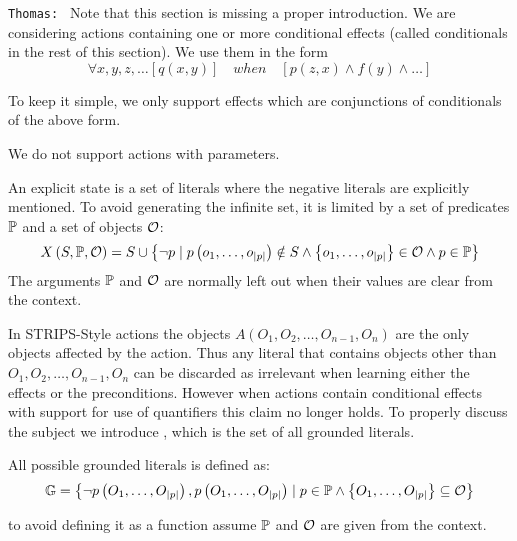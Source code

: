 \documentclass[\master/Master.tex]{subfiles}
\begin{document}
\texttt{Thomas: } Note that this section is missing a proper introduction. We are considering actions containing one or more conditional effects (called conditionals in the rest of this section). We use them in the form 
\begin{equation*}
    \forall x, y, z, \dots \left[ q(x, y) \right] \quad when \quad 
        \left[ p(z, x) \land f(y) \land \dots \right]
\end{equation*}

To keep it simple, we only support effects which are conjunctions of conditionals of the above form.

We do not support actions with parameters.


\begin{definition}
	An explicit state is a set of literals where the negative literals are explicitly mentioned. To avoid generating the infinite set, it is limited by a set of predicates $\mathbb{P}$ and a set of objects $\mathcal{O}$:
	\begin{equation*}
		X\left(S, \mathbb{P}, \mathcal{O}\right) = S \cup
		\left\{ \neg p \mid 
		p\left(o_1, \dots, o_{|p|}\right) \notin S \land 
		\left\{o_1, \dots, o_{|p|} \right\} \in \mathcal{O} \land
		p \in \mathbb{P}
		\right\}
	\end{equation*}
	The arguments $\mathbb{P}$ and $\mathcal{O}$ are normally left out when their values are clear from the context.
\end{definition}


In STRIPS-Style actions the objects $A(O_1,O_2,\ldots,O_{n-1},O_n)$ are the only objects affected by the action.
Thus any literal that contains objects other than $O_1,O_2,\ldots,O_{n-1},O_n$ can be discarded as irrelevant when learning either the effects or the preconditions.
However when actions contain conditional effects with support for use of quantifiers this claim no longer holds.
To properly discuss the subject we introduce \glits, which is the set of all grounded literals.
\begin{definition}
	All possible grounded literals \glits is defined as:
	\begin{equation*}
		\mathbb{G} =
		\left\{ \neg p\left(O_1, \dots, O_{|p|}\right), 
				p\left(O_1, \dots, O_{|p|}\right) 
				\mid 
		p \in \mathbb{P} \land 
		\left\{O_1, \dots, O_{|p|} \right\} \subseteq \mathcal{O}
		\right\}
	\end{equation*}
	
	to avoid defining it as a function assume $\mathbb{P}$ and $\mathcal{O}$ are given from the context.
\end{definition}
\end{document}
